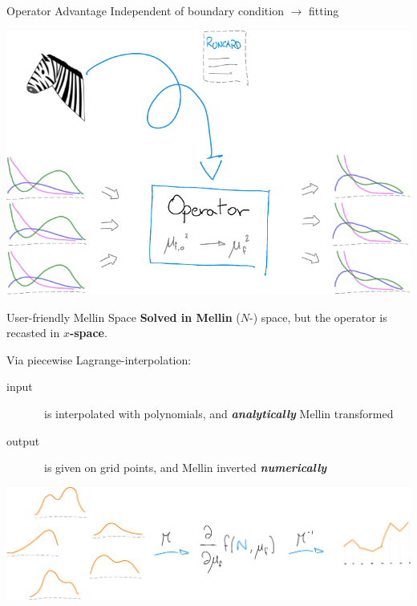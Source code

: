 \documentclass[9pt]{beamer}
\begin{document}
\begin{frame}{Operator Advantage}
    \vspace*{15pt}
    Independent of boundary condition $\to$ \pdf{} fitting

    \vspace*{25pt}
	\begin{center}
		\includegraphics[width=0.7\linewidth]{compute-ev-op-zebra}
	\end{center}
\end{frame}

\begin{frame}{User-friendly Mellin Space}
    \vspace*{15pt}
    \textbf{Solved in Mellin} ($N$-) space, but the operator is recasted in
    \textbf{$x$-space}.

    \vspace*{15pt}
     Via piecewise Lagrange-interpolation:
     \begin{description}
         \item[input] \pdf\ is interpolated with polynomials, and
             \textit{\textbf{analytically}} Mellin transformed
         \item[output] \pdf\ is given on grid points, and Mellin inverted
             \textit{\textbf{numerically}}
     \end{description}

    \vspace*{25pt}
	\begin{center}
		\includegraphics[width=0.9\linewidth]{mellin}
	\end{center}
\end{frame}
\end{document}
